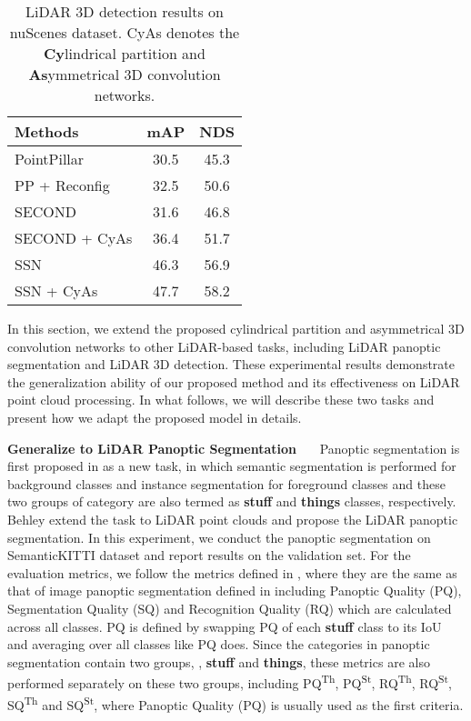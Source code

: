 \documentclass[final]{cvpr}
\newcommand{\PQ}{PQ}
\newcommand{\PQda}{PQ\textsuperscript{}}
\begin{document}
\begin{table}[t]
    \caption{LiDAR 3D detection results on nuScenes dataset. CyAs denotes the {\bf{Cy}}lindrical partition and {\bf{As}}ymmetrical 3D convolution networks.}
\centering
\begin{tabular*}{0.68\linewidth}{l|c|c}
            \hline
            Methods  & mAP & NDS \\
            \hline
            \hline
            PointPillar~\cite{lang2019pointpillars} & 30.5 & 45.3 \\
            \hline
            PP + Reconfig~\cite{wang2020reconfigurable} & 32.5 & 50.6 \\
            \hline
            SECOND~\cite{yan2018second} & 31.6 & 46.8\\
            \hline
            SECOND + CyAs & 36.4 & 51.7\\
            \hline
            SSN~\cite{zhu2020ssn}&  46.3 & 56.9 \\
            \hline
            SSN + CyAs & 47.7 & 58.2 \\
            \hline
            \end{tabular*}
    \label{tab:gene_nusc}
\end{table}

In this section, we extend the proposed cylindrical partition and asymmetrical 3D convolution networks to other LiDAR-based tasks, including LiDAR panoptic segmentation and LiDAR 3D detection. These experimental results demonstrate the generalization ability of our proposed method and its effectiveness on LiDAR point cloud processing.
In what follows, we will describe these two tasks and present how we adapt the proposed model in details.


\vspace{1ex}
\noindent\textbf{Generalize to LiDAR Panoptic Segmentation}~~~
Panoptic segmentation is first proposed in \cite{kirillov2019panoptic} as a new task, in which semantic segmentation is performed for background classes and instance segmentation for foreground classes and these two groups of category are also termed as {\bf{stuff}} and {\bf{things}} classes, respectively.
Behley \etal \cite{behley2020benchmark} extend the task to LiDAR point clouds and propose the LiDAR panoptic segmentation. In this experiment, we conduct the panoptic segmentation on SemanticKITTI dataset and report results on the validation set. For the evaluation metrics, we follow the metrics defined in \cite{behley2020benchmark}, where they are the same as that of image panoptic segmentation defined in \cite{kirillov2019panoptic} including Panoptic Quality (PQ), Segmentation Quality (SQ) and Recognition Quality (RQ) which are calculated across all classes. \PQda{} is defined by swapping \PQ{} of each {\bf{stuff}} class to its IoU and averaging over all classes like \PQ{} does. Since the categories in panoptic segmentation contain two groups, \ie, {\bf{stuff}} and {\bf{things}}, these metrics are also performed separately on these two groups, including PQ\textsuperscript{Th}, PQ\textsuperscript{St}, RQ\textsuperscript{Th}, RQ\textsuperscript{St}, SQ\textsuperscript{Th} and SQ\textsuperscript{St}, where Panoptic Quality (PQ) is usually used as the first criteria.
\end{document}
